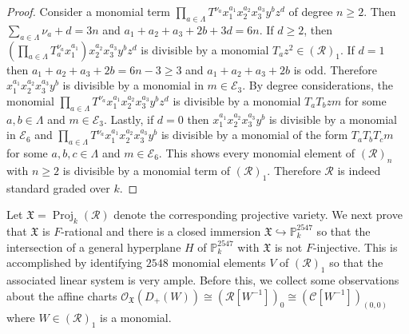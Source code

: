 \documentclass[reqno,11pt]{amsart}
\numberwithin{equation}{section}
\theoremstyle{definition}
\theoremstyle{definition}
\theoremstyle{definition}
\theoremstyle{remark}
\newcommand{\Proj}{\operatorname{Proj}}
\newcommand{\PP}{\mathbb{P}}
\newcommand{\cO}{\mathcal{O}}
\begin{document}
\begin{proof}
    Consider a monomial term $\prod_{a\in\Lambda}T^{\nu_a}x_1^{a_1}x_2^{a_2}x_3^{a_3}y^bz^d$ of degree $n \geq 2$. Then $\sum_{a\in\Lambda}\nu_a + d = 3n$ and $a_1+a_2+a_3 +2b + 3d = 6n$. If $d\geq 2$, then $\left(\prod_{a\in\Lambda}T^{\nu_a}_ax_1^{a_1}\right)x_2^{a_2}x_3^{a_3}y^bz^d$ is divisible by a monomial $T_az^2\in \left(\mathcal{R}\right)_1$. If $d = 1$ then $a_1+a_2+a_3+2b = 6n-3\geq 3$ and $a_1+a_2+a_3+2b$ is odd. Therefore $x_1^{a_1}x_2^{a_2}x_3^{a_3}y^b$ is divisible by a monomial in $m\in\mathcal{E}_3$. By degree considerations, the monomial $\prod_{a\in\Lambda}T^{\nu_a}x_1^{a_1}x_2^{a_2}x_3^{a_3}y^bz^d$  is divisible by a monomial $T_aT_bzm$ for some $a,b\in \Lambda$ and $m\in\mathcal{E}_3$. Lastly, if $d = 0$ then $x_1^{a_1}x_2^{a_2}x_3^{a_3}y^b$ is divisible by a monomial in $\mathcal{E}_6$ and $\prod_{a\in\Lambda}T^{\nu_a}x_1^{a_1}x_2^{a_2}x_3^{a_3}y^b$ is divisible by a monomial of the form $T_aT_bT_cm$ for some $a,b,c\in\Lambda$ and $m\in\mathcal{E}_6$. This shows every monomial element of $\left(\mathcal{R}\right)_n$ with $n\geq 2$ is divisible by a monomial term of $\left(\mathcal{R}\right)_1$. Therefore $\mathcal{R}$ is indeed standard graded over $k$.
\end{proof}

Let $\mathfrak{X} = \Proj_k(\mathcal{R})$ denote the corresponding projective variety. We next prove that $\mathfrak{X}$ is $F$-rational and there is a closed immersion $\mathfrak{X}\hookrightarrow\PP^{2547}_k$ so that the intersection of a general hyperplane $H$ of $\PP^{2547}_k$ with $\mathfrak{X}$ is not $F$-injective. This is accomplished by identifying $2548$ monomial elements $V$ of $\left(\mathcal{R}\right)_1$ so that the associated linear system is very ample. Before this, we collect some observations about the affine charts $\cO_\mathfrak{X}(D_+(W)) \cong \left(\mathcal{R}[W^{-1}]\right)_0 \cong \left(\mathcal{C}[W^{-1}]\right)_{(0,0)}$ where $W\in \left(\mathcal{R}\right)_1$ is a monomial.
\end{document}
